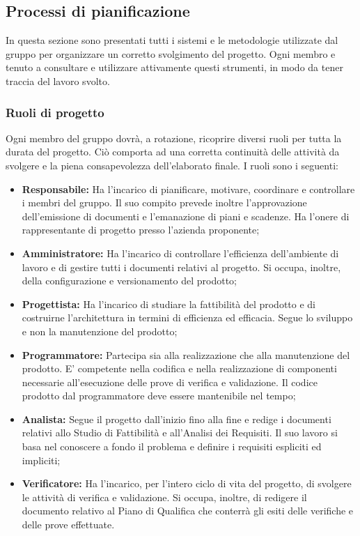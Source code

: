 \subsection{ Processi di pianificazione}
In questa sezione sono presentati tutti i sistemi e le metodologie utilizzate dal gruppo per organizzare un corretto svolgimento del progetto.
Ogni  membro e  tenuto  a  consultare  e utilizzare  attivamente  questi strumenti,  in  modo  da  tener traccia del lavoro svolto.
\subsubsection{Ruoli di progetto}
Ogni membro del gruppo dovrà, a rotazione, ricoprire diversi ruoli per tutta la durata del progetto. Ciò comporta ad una corretta continuità delle attività da svolgere e la piena consapevolezza dell’elaborato finale.
I ruoli sono i seguenti:
\begin{itemize}
\item \textbf{Responsabile:} Ha l'incarico di pianificare, motivare, coordinare e controllare i membri del gruppo.
Il suo compito prevede inoltre l'approvazione dell'emissione di documenti e l'emanazione di piani e scadenze.
Ha l'onere di rappresentante di progetto presso l'azienda proponente;
\item \textbf{Amministratore:} Ha l'incarico di controllare l'efficienza dell'ambiente di lavoro e di gestire tutti i documenti relativi al progetto. Si occupa, inoltre, della configurazione e versionamento del prodotto;
\item \textbf{Progettista:} Ha l'incarico di studiare la fattibilità del prodotto e di costruirne l'architettura in termini di efficienza ed efficacia. Segue lo sviluppo e non la manutenzione del prodotto;
\item \textbf{Programmatore:} Partecipa sia alla realizzazione che alla manutenzione del prodotto. E' competente nella codifica e nella realizzazione di componenti necessarie all’esecuzione delle prove di verifica e validazione. Il codice prodotto dal programmatore deve essere mantenibile nel tempo;
\item \textbf{Analista:} Segue il progetto dall'inizio fino alla fine e redige  i documenti relativi allo Studio di Fattibilità e all'Analisi dei Requisiti. Il suo lavoro si basa nel conoscere a fondo il problema e definire i requisiti espliciti ed impliciti;
\item \textbf{Verificatore:} Ha l'incarico, per l'intero ciclo di vita del progetto, di svolgere le attività di verifica e validazione. Si occupa, inoltre, di redigere il documento relativo al Piano di Qualifica che conterrà gli esiti delle verifiche e delle prove effettuate.
\end{itemize}
